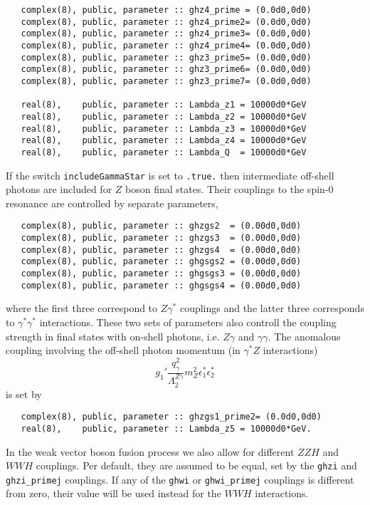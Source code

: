 \documentclass[aps,superscriptaddress,nofootinbib]{revtex4}
\begin{document}
\begin{verbatim}
   complex(8), public, parameter :: ghz4_prime = (0.0d0,0d0)
   complex(8), public, parameter :: ghz4_prime2= (0.0d0,0d0)
   complex(8), public, parameter :: ghz4_prime3= (0.0d0,0d0)
   complex(8), public, parameter :: ghz4_prime4= (0.0d0,0d0)
   complex(8), public, parameter :: ghz3_prime5= (0.0d0,0d0)
   complex(8), public, parameter :: ghz3_prime6= (0.0d0,0d0)
   complex(8), public, parameter :: ghz3_prime7= (0.0d0,0d0)

   real(8),    public, parameter :: Lambda_z1 = 10000d0*GeV
   real(8),    public, parameter :: Lambda_z2 = 10000d0*GeV
   real(8),    public, parameter :: Lambda_z3 = 10000d0*GeV
   real(8),    public, parameter :: Lambda_z4 = 10000d0*GeV
   real(8),    public, parameter :: Lambda_Q  = 10000d0*GeV
\end{verbatim}

If the switch \verb|includeGammaStar| is set to \verb|.true.| then intermediate off-shell photons are included for $Z$ boson final states.
Their couplings to the spin-0 resonance are controlled by separate parameters,
\begin{verbatim}
   complex(8), public, parameter :: ghzgs2  = (0.00d0,0d0)
   complex(8), public, parameter :: ghzgs3  = (0.00d0,0d0)
   complex(8), public, parameter :: ghzgs4  = (0.00d0,0d0)
   complex(8), public, parameter :: ghgsgs2 = (0.00d0,0d0)
   complex(8), public, parameter :: ghgsgs3 = (0.00d0,0d0)
   complex(8), public, parameter :: ghgsgs4 = (0.00d0,0d0)
\end{verbatim}
where the first three correspond to $Z\gamma^*$ couplings and the latter three corresponds to $\gamma^* \gamma^*$ interactions.
These two sets of parameters also controll the coupling strength in final states with on-shell photons, i.e. $Z\gamma$ and $\gamma\gamma$.
The anomalous coupling involving the off-shell photon momentum (in $\gamma^* Z$ interactions)
\[
g_1' \frac{ q^2_\gamma }{ \Lambda_2^{Z\gamma} } m_Z^2 \epsilon^*_1 \epsilon^*_2
\]
is set by
\begin{verbatim}
   complex(8), public, parameter :: ghzgs1_prime2= (0.0d0,0d0)
   real(8),    public, parameter :: Lambda_z5 = 10000d0*GeV.
\end{verbatim}

In the weak vector boson fusion process we also allow for different $ZZH$ and $WWH$ couplings.
Per default, they are assumed to be equal, set by the {\tt ghzi} and {\tt ghzi\_primej} couplings.
If any of the {\tt ghwi} or {\tt ghwi\_primej} couplings is different from zero,
their value will be used instead for the $WWH$ interactions.
\end{document}
